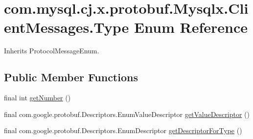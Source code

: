 \hypertarget{enumcom_1_1mysql_1_1cj_1_1x_1_1protobuf_1_1_mysqlx_1_1_client_messages_1_1_type}{}\section{com.\+mysql.\+cj.\+x.\+protobuf.\+Mysqlx.\+Client\+Messages.\+Type Enum Reference}
\label{enumcom_1_1mysql_1_1cj_1_1x_1_1protobuf_1_1_mysqlx_1_1_client_messages_1_1_type}


Inherits Protocol\+Message\+Enum.

\subsection*{Public Member Functions}
\begin{DoxyCompactItemize}
\item 
final int \mbox{\hyperlink{enumcom_1_1mysql_1_1cj_1_1x_1_1protobuf_1_1_mysqlx_1_1_client_messages_1_1_type_a0d2e8aad8efc94bc3acea25506efd5de}{get\+Number}} ()
\item 
final com.\+google.\+protobuf.\+Descriptors.\+Enum\+Value\+Descriptor \mbox{\hyperlink{enumcom_1_1mysql_1_1cj_1_1x_1_1protobuf_1_1_mysqlx_1_1_client_messages_1_1_type_ac01aba2f05b45d2d815a17775c289b0c}{get\+Value\+Descriptor}} ()
\item 
final com.\+google.\+protobuf.\+Descriptors.\+Enum\+Descriptor \mbox{\hyperlink{enumcom_1_1mysql_1_1cj_1_1x_1_1protobuf_1_1_mysqlx_1_1_client_messages_1_1_type_ae71c49568c6960276ede48b146d4be30}{get\+Descriptor\+For\+Type}} ()
\end{DoxyCompactItemize}
